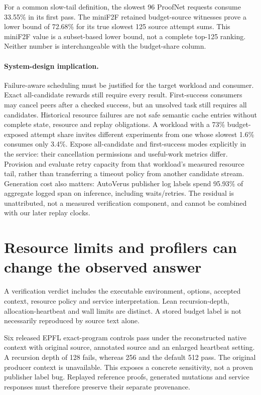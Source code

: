 \documentclass[10pt,twocolumn]{article}
\begin{document}
For a common slow-tail definition, the slowest 96 ProofNet requests consume
33.55\% in its first pass. The miniF2F retained budget-source witnesses prove
a lower bound of 72.68\% for its true slowest 125 source attempt sums.
This miniF2F value is a subset-based lower bound, not a complete top-125
ranking. Neither number is interchangeable with the budget-share column.

\paragraph{System-design implication.}
Failure-aware scheduling must be justified for the target workload and
consumer. Exact all-candidate rewards still require every result.
First-success consumers may cancel peers after a checked success, but an
unsolved task still requires all candidates. Historical resource failures
are not safe semantic cache entries without complete state, resource and
replay obligations.
A workload with a 73\% budget-exposed attempt share invites different
experiments from one whose slowest 1.6\% consumes only 3.4\%.
Expose all-candidate and first-success modes explicitly in the service:
their cancellation permissions and useful-work metrics differ. Provision
and evaluate retry capacity from that workload's measured resource tail,
rather than transferring a timeout policy from another candidate stream.
Generation cost also matters: AutoVerus publisher log labels spend
95.93\% of aggregate logged span on inference, including waits/retries.
The residual is unattributed, not a measured verification component, and
cannot be combined with our later replay clocks.

\section{Resource limits and profilers can change the observed answer}
\label{sec:reproducibility}
A verification verdict includes the executable environment, options,
accepted context, resource policy and service interpretation.
Lean recursion-depth, allocation-heartbeat and wall limits are distinct.
A stored budget label is not necessarily reproduced by source text alone.

Six released EPFL exact-program controls pass under the reconstructed
native context with original source, annotated source and an enlarged
heartbeat setting. A recursion depth of 128 fails, whereas 256 and the
default 512 pass. The original producer context is unavailable.
This exposes a concrete sensitivity, not a proven publisher label bug.
Replayed reference proofs, generated mutations and service responses must
therefore preserve their separate provenance.
\end{document}
